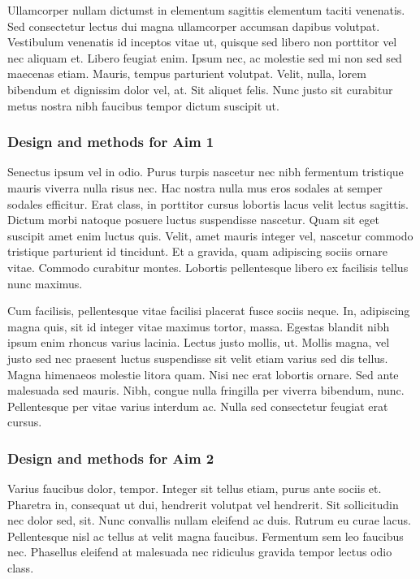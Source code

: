 \documentclass[11pt,]{article}
\begin{document}
Ullamcorper nullam dictumst in elementum sagittis elementum taciti
venenatis. Sed consectetur lectus dui magna ullamcorper accumsan dapibus
volutpat. Vestibulum venenatis id inceptos vitae ut, quisque sed libero
non porttitor vel nec aliquam et. Libero feugiat enim. Ipsum nec, ac
molestie sed mi non sed sed maecenas etiam. Mauris, tempus parturient
volutpat. Velit, nulla, lorem bibendum et dignissim dolor vel, at. Sit
aliquet felis. Nunc justo sit curabitur metus nostra nibh faucibus
tempor dictum suscipit ut.

\hypertarget{design-and-methods-for-aim-1}{%
\subsubsection{Design and methods for Aim
1}\label{design-and-methods-for-aim-1}}

Senectus ipsum vel in odio. Purus turpis nascetur nec nibh fermentum
tristique mauris viverra nulla risus nec. Hac nostra nulla mus eros
sodales at semper sodales efficitur. Erat class, in porttitor cursus
lobortis lacus velit lectus sagittis. Dictum morbi natoque posuere
luctus suspendisse nascetur. Quam sit eget suscipit amet enim luctus
quis. Velit, amet mauris integer vel, nascetur commodo tristique
parturient id tincidunt. Et a gravida, quam adipiscing sociis ornare
vitae. Commodo curabitur montes. Lobortis pellentesque libero ex
facilisis tellus nunc maximus.

Cum facilisis, pellentesque vitae facilisi placerat fusce sociis neque.
In, adipiscing magna quis, sit id integer vitae maximus tortor, massa.
Egestas blandit nibh ipsum enim rhoncus varius lacinia. Lectus justo
mollis, ut. Mollis magna, vel justo sed nec praesent luctus suspendisse
sit velit etiam varius sed dis tellus. Magna himenaeos molestie litora
quam. Nisi nec erat lobortis ornare. Sed ante malesuada sed mauris.
Nibh, congue nulla fringilla per viverra bibendum, nunc. Pellentesque
per vitae varius interdum ac. Nulla sed consectetur feugiat erat cursus.

\hypertarget{design-and-methods-for-aim-2}{%
\subsubsection{Design and methods for Aim
2}\label{design-and-methods-for-aim-2}}

Varius faucibus dolor, tempor. Integer sit tellus etiam, purus ante
sociis et. Pharetra in, consequat ut dui, hendrerit volutpat vel
hendrerit. Sit sollicitudin nec dolor sed, sit. Nunc convallis nullam
eleifend ac duis. Rutrum eu curae lacus. Pellentesque nisl ac tellus at
velit magna faucibus. Fermentum sem leo faucibus nec. Phasellus eleifend
at malesuada nec ridiculus gravida tempor lectus odio class.
\end{document}
